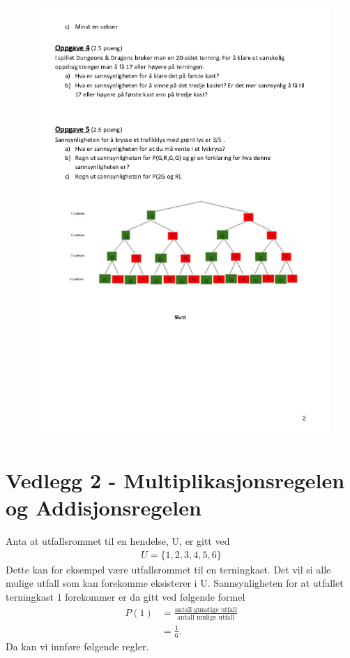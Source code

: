 \documentclass[main.tex]{subfiles}
\begin{document}
\begin{figure}[h!]
  \centering
  \includegraphics[width=.9\linewidth]{../figures/test2.png}
\end{figure}

\newpage
\section*{Vedlegg 2 - Multiplikasjonsregelen og Addisjonsregelen}

Anta at utfallsrommet til en hendelse, U, er gitt ved 
\begin{align}
U = \{1,2,3,4,5,6\}
\end{align}
Dette kan for eksempel være utfallsrommet til en terningkast. Det vil si alle
mulige utfall som kan forekomme eksisterer i U. Sannsynligheten for at utfallet
terningkast $1$ forekommer er da gitt ved følgende formel
\begin{align}
P(1) &= \frac{\text{antall gunstige utfall}}{\text{antall mulige utfall}} \\
     &= \frac{1}{6}. \nonumber
\end{align}
Da kan vi innføre følgende regler.
\end{document}
